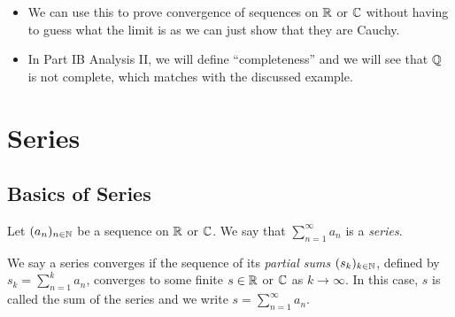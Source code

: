 \documentclass[../main.tex]{subfiles}
\begin{document}
\begin{remark}[Remarks]
  \begin{itemize}
    \item We can use this to prove convergence of sequences on $\mathbb{R}$ or $\mathbb{C}$ without having to guess what the limit is as we can just show that they are Cauchy.
    \item In Part IB Analysis II, we will define ``completeness'' and we will see that $\mathbb{Q}$ is not complete, which matches with the discussed example.
  \end{itemize}
\end{remark}
\section{Series}
\subsection{Basics of Series}
\begin{definition}
  Let $(a_n)_{n \in \mathbb{N}}$ be a sequence on $\mathbb{R}$ or $\mathbb{C}$.
  We say that $\sum_{n=1}^{\infty} a_n$ is a \textit{series}.

  We say a series converges if the sequence of its \textit{partial sums} $(s_k)_{k \in \mathbb{N}}$, defined by $s_k = \sum_{n = 1}^{k} a_n$, converges to some finite $s \in \mathbb{R}$ or $\mathbb{C}$ as $k \to \infty$.
  In this case, $s$ is called the sum of the series and we write $s = \sum_{n = 1}^{\infty} a_n$.
\end{definition}
\end{document}
